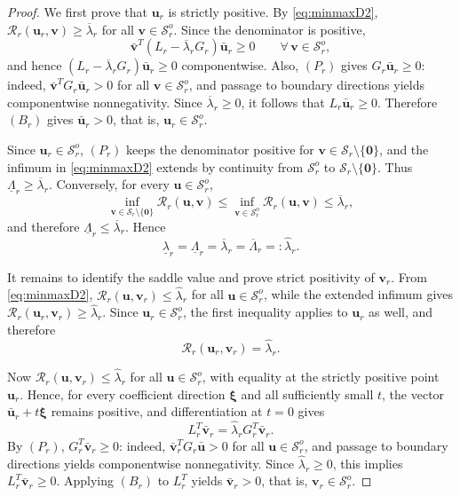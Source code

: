 \documentclass[preprint,10pt]{elsarticle}
\theoremstyle{plain}
\theoremstyle{definition}
\theoremstyle{remark}
\begin{document}
\begin{proof}
	We first prove that $\mathbf{u}_r$ is strictly positive. By
	\eqref{eq:minmaxD2},
	$\mathcal{R}_r(\mathbf{u}_r,\mathbf{v})\ge\overline\lambda_r$
	for all $\mathbf{v}\in\mathcal{S}_r^o$. Since the denominator is positive,
	\[
	\bar{\mathbf v}^{T}(L_r-\overline\lambda_r G_r)\bar{\mathbf u}_r\ge0
	\qquad \forall\,\mathbf v\in\mathcal S_r^o,
	\]
	and hence $(L_r-\overline\lambda_r G_r)\bar{\mathbf{u}}_r\ge0$ componentwise.
	Also, $(P_r)$ gives $G_r\bar{\mathbf{u}}_r\ge0$: indeed,
	$\bar{\mathbf v}^{T}G_r\bar{\mathbf u}_r>0$ for all
	$\mathbf v\in\mathcal S_r^o$, and passage to boundary directions yields
	componentwise nonnegativity. Since $\overline\lambda_r\ge0$, it follows that
	$L_r\bar{\mathbf{u}}_r\ge0$. Therefore $(B_r)$ gives
	$\bar{\mathbf{u}}_r>0$, that is, $\mathbf{u}_r\in\mathcal{S}_r^o$.
	
	Since $\mathbf{u}_r\in\mathcal{S}_r^o$, $(P_r)$ keeps the denominator positive
	for $\mathbf v\in\mathcal S_r\setminus\{\mathbf0\}$, and the infimum in
	\eqref{eq:minmaxD2} extends by continuity from $\mathcal{S}_r^o$ to
	$\mathcal{S}_r\setminus\{\mathbf{0}\}$. Thus
	$\underline\Lambda_r\ge\overline\lambda_r$. Conversely, for every
	$\mathbf u\in\mathcal{S}_r^o$,
	\[
	\inf_{\mathbf v\in\mathcal{S}_r\setminus\{\mathbf0\}}
	\mathcal R_r(\mathbf u,\mathbf v)
	\le
	\inf_{\mathbf v\in\mathcal{S}_r^o}
	\mathcal R_r(\mathbf u,\mathbf v)
	\le
	\overline\lambda_r,
	\]
	and therefore $\underline\Lambda_r\le\overline\lambda_r$. Hence
	\[
	\underline\lambda_r=\underline\Lambda_r=\overline\lambda_r=\overline\Lambda_r=:\hat\lambda_r.
	\]
	
	It remains to identify the saddle value and prove strict positivity of
	$\mathbf{v}_r$. From \eqref{eq:minmaxD2},
	$\mathcal{R}_r(\mathbf{u},\mathbf{v}_r)\le\hat\lambda_r$ for all
	$\mathbf{u}\in\mathcal{S}_r^o$, while the extended infimum gives
	$\mathcal{R}_r(\mathbf{u}_r,\mathbf{v}_r)\ge\hat\lambda_r$. Since
	$\mathbf{u}_r\in\mathcal{S}_r^o$, the first inequality applies to
	$\mathbf{u}_r$ as well, and therefore
	\[
	\mathcal{R}_r(\mathbf{u}_r,\mathbf{v}_r)=\hat\lambda_r.
	\]
	
	Now $\mathcal{R}_r(\mathbf{u},\mathbf{v}_r)\le\hat\lambda_r$ for all
	$\mathbf u\in\mathcal S_r^o$, with equality at the strictly positive point
	$\mathbf u_r$. Hence, for every coefficient direction $\boldsymbol\xi$ and
	all sufficiently small \(t\), the vector
	\(\bar{\mathbf u}_r+t\boldsymbol\xi\) remains positive, and differentiation
	at \(t=0\) gives
	\[
	L_r^T\bar{\mathbf{v}}_r=\hat\lambda_r G_r^T\bar{\mathbf{v}}_r.
	\]
	By $(P_r)$, $G_r^T\bar{\mathbf{v}}_r\ge0$: indeed,
	$\bar{\mathbf v}_r^T G_r\bar{\mathbf u}>0$ for all
	$\mathbf u\in\mathcal S_r^o$, and passage to boundary directions yields
	componentwise nonnegativity. Since $\hat\lambda_r\ge0$, this implies
	$L_r^T\bar{\mathbf{v}}_r\ge0$. Applying $(B_r)$ to $L_r^T$ yields
	$\bar{\mathbf{v}}_r>0$, that is, $\mathbf{v}_r\in\mathcal{S}_r^o$.
	

\end{proof}
\end{document}
